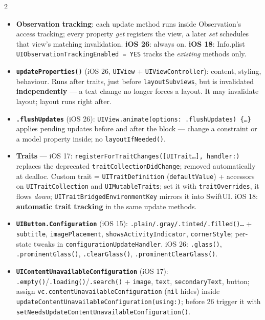 \documentclass[8pt]{extarticle}
\newcommand\ct[1]{\texttt{#1}}
\newcommand\hd[1]{\par\vspace{3pt}\noindent{\bfseries\color{sheetBlue}#1}\par\vspace{1pt}}
\begin{document}
\begin{multicols}{2}
\raggedright{}

\hd{How it works}
\begin{itemize}
  \item \textbf{Observation tracking}: each update method runs inside Observation's access tracking;
        every property \emph{get} registers the view, a later \emph{set} schedules that view's
        matching invalidation. \textbf{iOS 26}: always on. \textbf{iOS 18}: Info.plist
        \ct{UIObservationTrackingEnabled = YES} tracks the \emph{existing} methods only.
  \item \textbf{\ct{updateProperties()}} (iOS 26, \ct{UIView} + \ct{UIViewController}): content,
        styling, behaviour. Runs after traits, just before \ct{layoutSubviews}, but is invalidated
        \textbf{independently} — a text change no longer forces a layout. It may invalidate
        layout; layout runs right after.
  \item \textbf{\ct{.flushUpdates}} (iOS 26): \ct{UIView.animate(options: .flushUpdates) \{…\}} applies
        pending updates before and after the block — change a constraint or a model property inside;
        no \ct{layoutIfNeeded()}.
  \item \textbf{Traits} — iOS 17: \ct{registerForTraitChanges([UITrait…], handler:)} replaces the
        deprecated \ct{traitCollectionDidChange}; removed automatically at dealloc. Custom trait =
        \ct{UITraitDefinition} (\ct{defaultValue}) + accessors on \ct{UITraitCollection} and
        \ct{UIMutableTraits}; set it with \ct{traitOverrides}, it flows \emph{down};
        \ct{UITraitBridgedEnvironmentKey} mirrors it into SwiftUI. iOS 18: \textbf{automatic trait
        tracking} in the same update methods.
  \item \textbf{\ct{UIButton.Configuration}} (iOS 15): \ct{.plain/.gray/.tinted/.filled()…} +
        \ct{subtitle}, \ct{imagePlacement}, \ct{showsActivityIndicator}, \ct{cornerStyle}; per-state
        tweaks in \ct{configurationUpdateHandler}. iOS 26: \ct{.glass()}, \ct{.prominentGlass()},
        \ct{.clearGlass()}, \ct{.prominentClearGlass()}.
  \item \textbf{\ct{UIContentUnavailableConfiguration}} (iOS 17): \ct{.empty()}/\ct{.loading()}/\ct{.search()}
        + \ct{image}, \ct{text}, \ct{secondaryText}, button; assign
        \ct{vc.contentUnavailableConfiguration} (\ct{nil} hides) inside
        \ct{updateContentUnavailableConfiguration(using:)}; before 26 trigger it with
        \ct{setNeedsUpdateContentUnavailableConfiguration()}.
\end{itemize}


\end{multicols}
\end{document}
